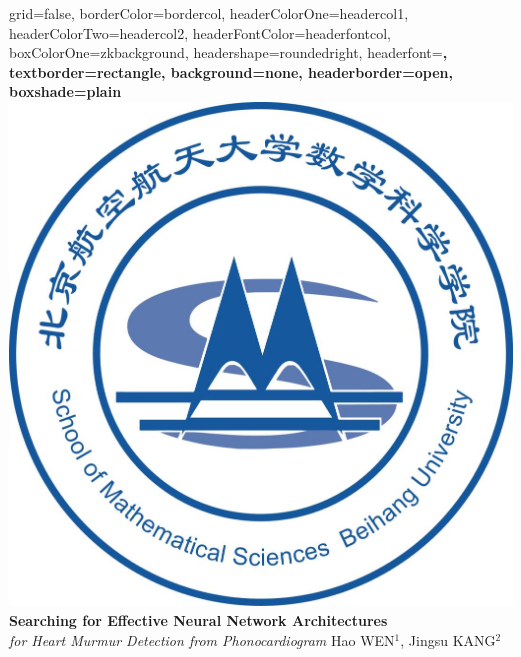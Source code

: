 \documentclass[a0paper,portrait]{baposter}
\begin{document}

\begin{poster}{
grid=false,
borderColor=bordercol, %
headerColorOne=headercol1, %
headerColorTwo=headercol2, %
headerFontColor=headerfontcol, %
boxColorOne=zkbackground,
headershape=roundedright, %
headerfont=\Large\sf\bf, %
textborder=rectangle,
background=none,
headerborder=open, %
boxshade=plain
}
%
%
{\includegraphics[scale=0.090]{logo_buaa_math.jpg}} %
{
{\bf \fontsize{19pt}{19pt} \selectfont Searching for Effective Neural Network Architectures} \\
{\it \LARGE  for Heart Murmur Detection from Phonocardiogram}
} %
{\vspace{0.3em} \smaller Hao WEN$^1$, Jingsu KANG$^2$  \\  %
  
}
\end{poster}
\end{document}
